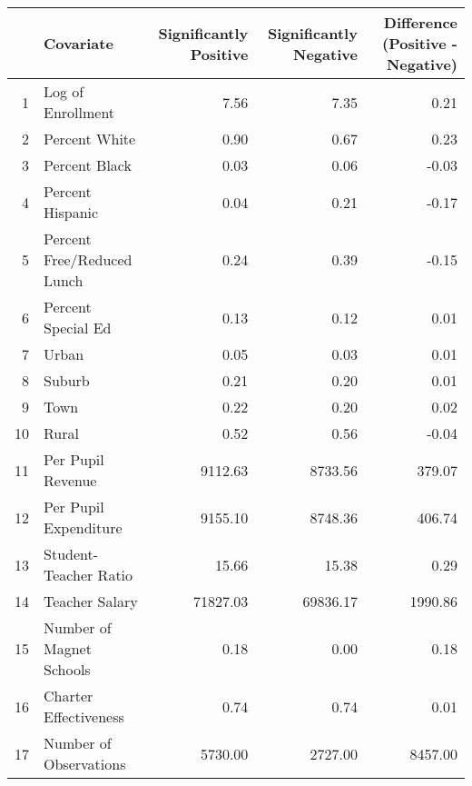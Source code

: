 \begin{tabular}{rlrrr}
  \hline
 & Covariate & Significantly Positive & Significantly Negative & Difference (Positive - Negative) \\ 
  \hline
1 & Log of Enrollment & 7.56 & 7.35 & 0.21 \\ 
  2 & Percent White & 0.90 & 0.67 & 0.23 \\ 
  3 & Percent Black & 0.03 & 0.06 & -0.03 \\ 
  4 & Percent Hispanic & 0.04 & 0.21 & -0.17 \\ 
  5 & Percent Free/Reduced Lunch & 0.24 & 0.39 & -0.15 \\ 
  6 & Percent Special Ed & 0.13 & 0.12 & 0.01 \\ 
  7 & Urban & 0.05 & 0.03 & 0.01 \\ 
  8 & Suburb & 0.21 & 0.20 & 0.01 \\ 
  9 & Town & 0.22 & 0.20 & 0.02 \\ 
  10 & Rural & 0.52 & 0.56 & -0.04 \\ 
  11 & Per Pupil Revenue & 9112.63 & 8733.56 & 379.07 \\ 
  12 & Per Pupil Expenditure & 9155.10 & 8748.36 & 406.74 \\ 
  13 & Student-Teacher Ratio & 15.66 & 15.38 & 0.29 \\ 
  14 & Teacher Salary & 71827.03 & 69836.17 & 1990.86 \\ 
  15 & Number of Magnet Schools & 0.18 & 0.00 & 0.18 \\ 
  16 & Charter Effectiveness & 0.74 & 0.74 & 0.01 \\ 
  17 & Number of Observations & 5730.00 & 2727.00 & 8457.00 \\ 
   \hline
\end{tabular}
